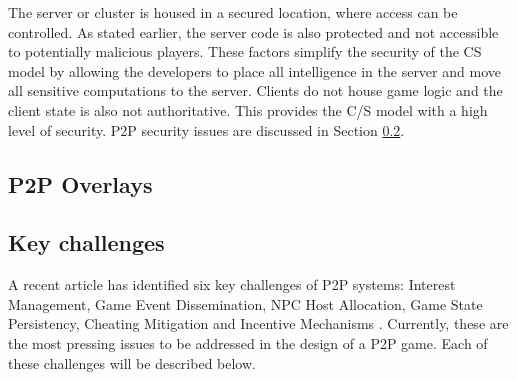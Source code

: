 \documentclass[journal,oneside,a4paper,onecolumn]{IEEEtran}
\begin{document}
The server or cluster is housed in a secured location, where access can be controlled. As stated earlier, the server code is also protected and not accessible to potentially malicious players. These factors simplify the security of the \ac{CS} model by allowing the developers to place all intelligence in the server and move all sensitive computations to the server. Clients do not house game logic and the client state is also not authoritative. This provides the C/S model with a high level of security. P2P security issues are discussed in Section \ref{key_challenges}.

\subsection{P2P Overlays}

\subsection{Key challenges}
\label{key_challenges}

A recent article has identified six key challenges of P2P systems: Interest Management, Game Event Dissemination, NPC Host Allocation, Game State Persistency, Cheating Mitigation and Incentive Mechanisms \cite{Fan_deisgn_issues_p2p}. Currently, these are the most pressing issues to be addressed in the design of a P2P game. Each of these challenges will be described below.



\end{document}
